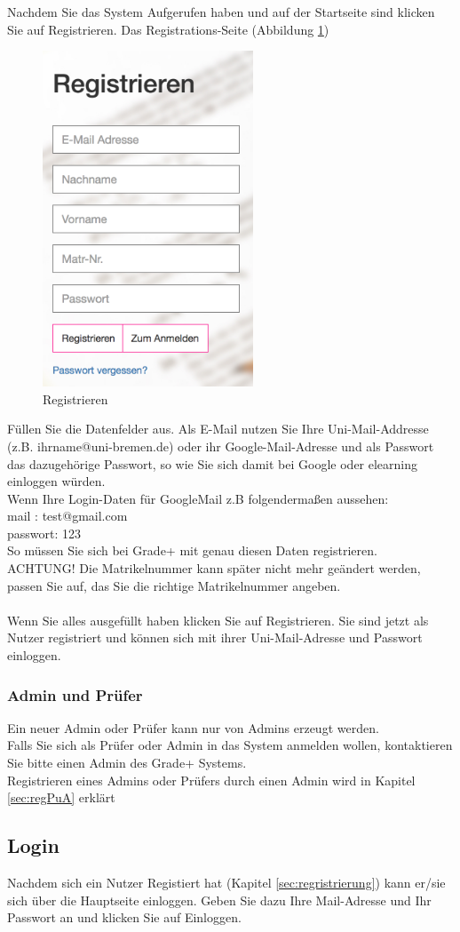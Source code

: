 Nachdem Sie das System Aufgerufen haben und auf der Startseite sind klicken Sie auf Registrieren. Das Registrations-Seite (Abbildung \ref{fig 2})
\begin{figure}[H]
	\centering
	\caption{Registrieren}
  \includegraphics[width=\textwidth,height=10cm,keepaspectratio]{../screenshots/Registrieren/Pruefling/registrieren1.png}
	
	\label{fig 2}
\end{figure}

Füllen Sie die Datenfelder aus. Als E-Mail nutzen Sie Ihre Uni-Mail-Addresse (z.B. ihrname@uni-bremen.de) oder ihr Google-Mail-Adresse und als Passwort das dazugehörige Passwort, so wie Sie sich damit bei Google oder elearning einloggen würden.\\
Wenn Ihre Login-Daten für GoogleMail z.B folgendermaßen aussehen:\\
mail : test@gmail.com\\
passwort: 123\\

So müssen Sie sich bei Grade+ mit genau diesen Daten registrieren.\\
ACHTUNG! Die Matrikelnummer kann später nicht mehr geändert werden, passen Sie auf, das Sie die richtige Matrikelnummer angeben. \\
\\
Wenn Sie alles ausgefüllt haben klicken Sie auf Registrieren. Sie sind jetzt als Nutzer registriert und können sich mit ihrer Uni-Mail-Adresse und Passwort einloggen.


\subsubsection{Admin und Prüfer}
Ein neuer Admin oder Prüfer kann nur von Admins erzeugt werden.\\
Falls Sie sich als Prüfer oder Admin in das System anmelden wollen, kontaktieren Sie bitte einen Admin des Grade+ Systems.\\
Registrieren eines Admins oder Prüfers durch einen Admin wird in {Kapitel \ref{sec:regPuA}} erklärt

\subsection{Login}
Nachdem sich ein Nutzer Registiert hat ({Kapitel \ref{sec:regristrierung}}) kann er/sie sich über die Hauptseite einloggen. Geben Sie dazu Ihre Mail-Adresse und Ihr Passwort an und klicken Sie auf Einloggen.